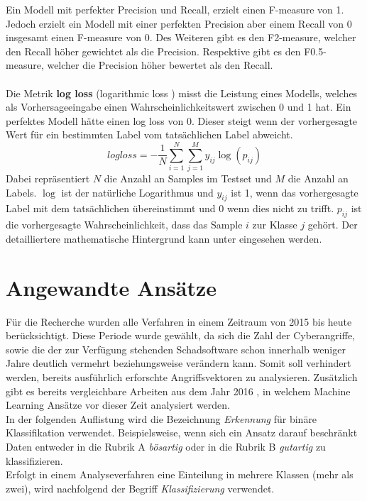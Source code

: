 \documentclass[
    12pt, %
    DIV10,
    ngerman, %
    a4paper, %
    oneside, %
    titlepage, %
    parskip=half, %
    headings=normal, %
    listof=totoc, %
    bibliography=totoc, %
    index=totoc, %
    captions=tableheading, %
    final %
]{scrreprt}
\begin{document}
Ein Modell mit perfekter Precision und Recall, erzielt einen F-measure von 1. Jedoch erzielt ein Modell mit einer perfekten Precision aber einem Recall von 0 insgesamt einen F-measure von 0. Des Weiteren gibt es den F2-measure, welcher den Recall höher gewichtet als die Precision. Respektive gibt es den F0.5-measure, welcher die Precision höher bewertet als den Recall.
\\\\
Die Metrik \textbf{log loss} (logarithmic loss ) misst die Leistung eines Modells, welches als Vorhersageeingabe einen Wahrscheinlichkeitswert zwischen 0 und 1 hat. Ein perfektes Modell hätte einen log loss von 0. Dieser steigt wenn der vorhergesagte Wert für ein bestimmten Label vom tatsächlichen Label abweicht.
$$log loss = -\frac{1}{N}\displaystyle\sum_{i=1}^{N}\displaystyle\sum_{j=1}^{M} y_{ij}\log(p_{ij})$$
Dabei repräsentiert $N$ die Anzahl an Samples im Testset und $M$ die Anzahl an Labels. $\log$ ist der natürliche Logarithmus und $y_{ij}$ ist 1, wenn das vorhergesagte Label mit dem tatsächlichen übereinstimmt und 0 wenn dies nicht zu trifft. $p_{ij}$ ist die vorhergesagte Wahrscheinlichkeit, dass das Sample $i$ zur Klasse $j$ gehört. Der detailliertere mathematische Hintergrund kann unter \textcite{Nielsen} eingesehen werden.
\section{Angewandte Ansätze}
Für die Recherche wurden alle Verfahren in einem Zeitraum von 2015 bis heute berücksichtigt. Diese Periode wurde gewählt, da sich die Zahl der Cyberangriffe, sowie die der zur Verfügung stehenden Schadsoftware schon innerhalb weniger Jahre deutlich vermehrt beziehungsweise verändern kann. Somit soll verhindert werden, bereits ausführlich erforschte Angriffsvektoren zu analysieren. Zusätzlich gibt es bereits vergleichbare Arbeiten aus dem Jahr 2016 \parencite[s.][]{Buczak2016}, in welchem Machine Learning Ansätze vor dieser Zeit analysiert werden.\\
In der folgenden Auflistung wird die Bezeichnung \emph{Erkennung} für binäre Klassifikation verwendet. Beispielsweise, wenn sich ein Ansatz darauf beschränkt Daten entweder in die Rubrik A \emph{bösartig} oder in die Rubrik B \emph{gutartig} zu klassifizieren.\\
Erfolgt in einem Analyseverfahren eine Einteilung in mehrere Klassen (mehr als zwei), wird nachfolgend der Begriff 
\emph{Klassifizierung} verwendet.


\end{document}
